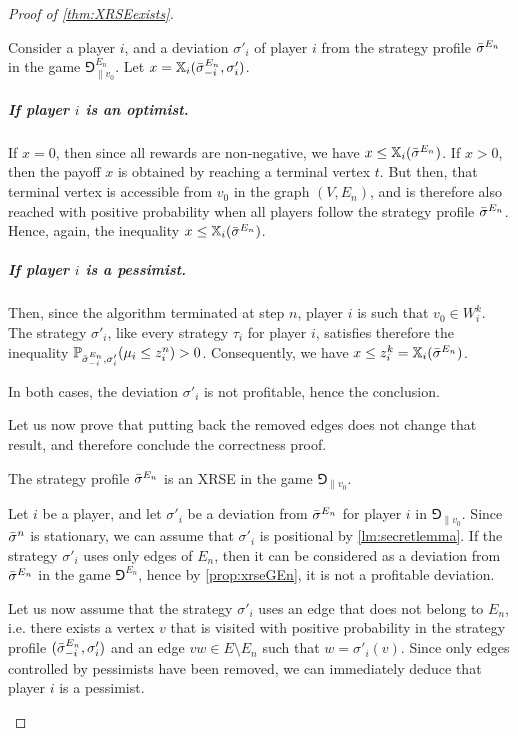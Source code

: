 \begin{proof}[Proof of \cref{thm:XRSEexists}]
\begin{claimproof}
    Consider a player $i$, and a deviation $\sigma'_i$ of player $i$ from the strategy profile ${\bar{\sigma}}^{E_n}$ in the game $\Game_{\|v_0}^{E_n}$.
    Let $x = \mathbb{X}_i({\bar{\sigma}}^{E_n}_{-i}, \sigma'_i)$.

    \subparagraph*{If player $i$ is an optimist.}
    If $x = 0$, then since all rewards are non-negative, we have $x \leq \mathbb{X}_i({\bar{\sigma}}^{E_n})$.
    If $x > 0$, then the payoff $x$ is obtained by reaching a terminal vertex $t$.
    But then, that terminal vertex is accessible from $v_0$ in the graph $(V, E_n)$, and is therefore also reached with positive probability when all players follow the strategy profile ${\bar{\sigma}}^{E_n}$.
    Hence, again, the inequality $x \leq \mathbb{X}_i({\bar{\sigma}}^{E_n})$.
    
    \subparagraph*{If player $i$ is a pessimist.}
    Then, since the algorithm terminated at step $n$, player $i$ is such that $v_0 \in W_i^k$.
    The strategy $\sigma'_i$, like every strategy $\tau_i$ for player $i$, satisfies therefore the inequality $\mathbb{P}_{{\bar{\sigma}}^{E_n}_{-i}, \sigma'_i}(\mu_i \leq z_i^n) > 0$.
    Consequently, we have $x \leq z_i^k = \mathbb{X}_i({\bar{\sigma}}^{E_n})$.

    In both cases, the deviation $\sigma'_i$ is not profitable, hence the conclusion.
\end{claimproof}


Let us now prove that putting back the removed edges does not change that result, and therefore conclude the correctness proof.

\begin{proposition}
    The strategy profile ${\bar{\sigma}}^{E_n}$ is an XRSE in the game $\Game_{\|v_0}$.
\end{proposition}

\begin{claimproof}
    Let $i$ be a player, and let $\sigma'_i$ be a deviation from ${\bar{\sigma}}^{E_n}$ for player $i$ in $\Game_{\|v_0}$.
    Since ${\bar{\sigma}}^n$ is stationary, we can assume that $\sigma'_i$ is positional by \cref{lm:secretlemma}.
    If the strategy $\sigma'_i$ uses only edges of $E_n$, then it can be considered as a deviation from ${\bar{\sigma}}^{E_n}$ in the game $\Game^{E_n}$, hence by \cref{prop:xrseGEn}, it is not a profitable deviation.
    
    Let us now assume that the strategy $\sigma'_i$ uses an edge that does not belong to $E_n$, i.e. there exists a vertex $v$ that is visited with positive probability in the strategy profile $({\bar{\sigma}}^{E_n}_{-i}, \sigma'_i)$ and an edge $vw \in E \setminus E_n$ such that $w = \sigma'_i(v)$.
    Since only edges controlled by pessimists have been removed, we can immediately deduce that player $i$ is a pessimist.
    

\end{claimproof}
\end{proof}
